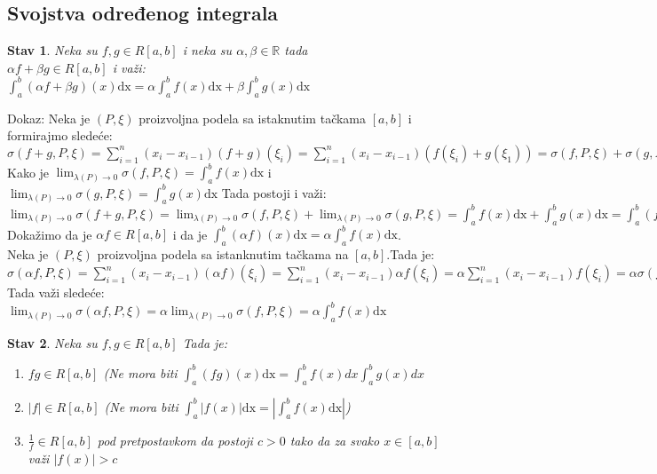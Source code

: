 \documentclass{article}
\newtheorem{stav}{Stav}[section]
\begin{document}
\subsection{Svojstva određenog integrala}
\begin{stavbox}
    \begin{stav}
        Neka su $f, g \in R[a, b]$ i neka su $\alpha, \beta \in \mathbb{R}$ tada\\
        $\alpha f +\beta g \in R[a, b]$ i važi:\\
        $\displaystyle \int^b_a(\alpha f + \beta g)(x)\text{dx} = \alpha\int^b_af(x)\text{dx} + \beta\int^b_ag(x)\text{dx}$
    \end{stav}
\end{stavbox}
Dokaz: Neka je $(P, \xi)$ proizvoljna podela sa istaknutim tačkama $[a, b]$ i formirajmo sledeće:\\
$\sigma(f+g, P, \xi) = \displaystyle \sum^n_{i=1} (x_i - x_{i-1})(f+g)(\xi_i) = \sum^n_{i=1} (x_i - x_{i-1})(f(\xi_i) + g(\xi_1)) = \sigma(f, P, \xi) + \sigma(g, P, \xi)$\\
Kako je $\displaystyle \lim_{\lambda(P)\rightarrow0} \sigma(f, P, \xi) = \int^b_a f(x)\text{dx}$ i $\displaystyle \lim_{\lambda(P)\rightarrow0} \sigma(g, P, \xi) = \int^b_a g(x)\text{dx}$ Tada postoji i važi: \\
$\displaystyle \lim_{\lambda(P)\rightarrow0} \sigma(f+g, P, \xi) = \lim_{\lambda(P)\rightarrow0} \sigma(f, P, \xi) + \lim_{\lambda(P)\rightarrow0} \sigma(g, P, \xi) = \int^b_a f(x)\text{dx} + \int^b_a g(x)\text{dx} = \int^b_a (f+g)(x)\text{dx}$\\
Dokažimo da je $\alpha f \in R[a, b]$ i da je $\displaystyle \int^b_a (\alpha f)(x)\text{dx} = \alpha \int^b_a f(x) \text{dx}$.\\
Neka je $(P, \xi)$ proizvoljna podela sa istanknutim tačkama na $[a, b]$.Tada je: \\
$\sigma(\alpha f, P, \xi) = \displaystyle \sum^n_{i = 1} (x_i - x_{i-1})(\alpha f)(\xi_i) = \sum^n_{i = 1} (x_i - x_{i-1})\alpha f(\xi_i) = \alpha\sum^n_{i = 1} (x_i - x_{i-1})f(\xi_i) = \alpha\sigma(f, P, \xi) = \int^b_a f(x)\text{dx}$\\
Tada važi sledeće:\\
$\displaystyle \lim_{\lambda(P)\rightarrow0} \sigma(\alpha f, P, \xi) = \alpha\lim_{\lambda(P)\rightarrow 0}\sigma(f, P, \xi) = \alpha \int^b_a f(x)\text{dx}$
\begin{stavbox}
    \begin{stav}
        Neka su $f, g \in R[a, b]$ Tada je:
        \begin{enumerate}
            \item $fg \in R[a, b]$ (Ne mora biti $\displaystyle \int^b_a (fg)(x)\text{dx} = \int^b_af(x)dx  \int^b_ag(x)dx$
            \item $|f|\in R[a, b]$ (Ne mora biti $\displaystyle \int^b_a |f(x)|\text{dx} = |\int^b_a f(x)\text{dx}| $)
            \item $\frac{1}{f} \in R[a, b]$ pod pretpostavkom da postoji $c > 0$ tako da za svako $x \in [a, b]$ važi $|f(x)| > c$
        \end{enumerate}
    \end{stav}
\end{stavbox}
\end{document}
